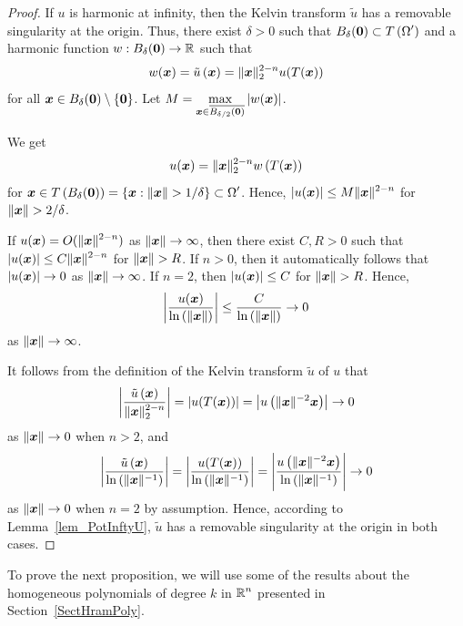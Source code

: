 \begin{proof}
If $u$ is harmonic at infinity, then the Kelvin transform
$\tilde{u}$ has a removable singularity at the origin.  Thus, there
exist $\delta>0$ such that
$\displaystyle B_{\delta}({\bm{0}}) \subset T\left(\Omega^{\prime}\right)$
and a harmonic function $w: B_{\delta}({\bm{0}}) \to \mathbb{R}$
such that 
\[
w({\bm{x}}) = \tilde{u}\left({\bm{x}}\right)
= \|{\bm{x}}\|_2^{2-n} u(T({\bm{x}}))
\]
for all ${\bm{x}} \in B_{\delta}({\bm{0}}) \setminus \{{\bm{0}}\}$.
Let
$\displaystyle M = \max_{{\bm{x}} \in \overline{B_{\delta/2}({\bm{0}})}}
|w({\bm{x}})|$.

We get
\[
u({\bm{x}}) = \|{\bm{x}}\|_2^{2-n} w\left(T({\bm{x}})\right)
\]
for $\displaystyle {\bm{x}} \in T\left(B_{\delta}({\bm{0}})\right)
= \left\{{\bm{x}} : \| {\bm{x}} \| > 1/\delta \right\} \subset \Omega^{\prime}$.
Hence, $\displaystyle | u({\bm{x}}) | \leq M \|{\bm{x}}\|^{2-n}$ for
$\|{\bm{x}}\| > 2/\delta$.

If $\displaystyle u({\bm{x}}) = O(\|{\bm{x}}\|^{2-n})$ as
$\|{\bm{x}}\| \rightarrow \infty$, then there exist $C, R >0$ such that
$\displaystyle |u({\bm{x}})| \leq C \|{\bm{x}}\|^{2-n}$ for $\|{\bm{x}}\| > R$.
If $n>0$, then it automatically follows that
$|u({\bm{x}})| \to 0$ as $\|{\bm{x}}\| \to \infty$.
If $n=2$, then $\displaystyle |u({\bm{x}})| \leq C $ for $\|{\bm{x}}\| > R$.
Hence,
\[
  \left| \frac{u({\bm{x}})}{\ln\left(\|{\bm{x}}\|\right)} \right|
  \leq \frac{C}{\ln\left(\|{\bm{x}}\|\right)} \to 0
\]
as $\|{\bm{x}}\|\to \infty$.

It follows from the definition of the Kelvin transform $\tilde{u}$ of
$u$ that
\[
\left| \frac{\tilde{u}\left({\bm{x}}\right)}{\|{\bm{x}}\|_2^{2-n}} \right|
= \left| u(T({\bm{x}})) \right|
= \left| u\left( \|{\bm{x}}\|^{-2}{\bm{x}}\right) \right| \to 0
\]
as $\|{\bm{x}}\| \to 0$ when $n>2$, and
\[
\left| \frac{\tilde{u}\left({\bm{x}}\right)}{\ln\left(\|{\bm{x}}\|^{-1}\right)}
\right|
= \left| \frac{u(T({\bm{x}}))}{\ln\left(\|{\bm{x}}\|^{-1}\right)} \right|
= \left| \frac{u\left( \|{\bm{x}}\|^{-2}{\bm{x}}\right)}
{\ln\left(\|{\bm{x}}\|^{-1}\right)} \right| \to 0
\]
as $\|{\bm{x}}\| \to 0$ when $n=2$ by assumption.
Hence, according to Lemma~\ref{lem_PotInftyU}, $\tilde{u}$ has a
removable singularity at the origin in both cases.
\end{proof}

To prove the next proposition, we will use some of the results about the
homogeneous polynomials of degree $k$ in $\displaystyle \mathbb{R}^n$ presented in
Section~\ref{SectHramPoly}.

